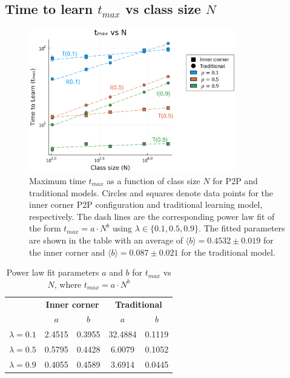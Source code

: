 \newpage

\subsection{Time to learn $t_{max}$ vs class size $N$} \label{subsec: 2DBPCA tmax vs N}
\begin{figure}[h!]
    \centering
    \includegraphics[width=0.8\textwidth]{figures/2D-BPCA-analysis/N_vs_tmax-traditional-inner_corner.png}
    \caption[Class size dependence of time to learn in homogenous models]{Maximum time $t_{max}$ as a function of class size $N$ for P2P and traditional models. Circles and squares denote data points for the inner corner P2P configuration and traditional learning model, respectively. The dash lines are the corresponding power law fit of the form $t_{max}=a \cdot N^b$ using $\lambda \in \lbrace 0.1, 0.5, 0.9 \rbrace$. The fitted parameters are shown in the table with an average of $\langle b \rangle = 0.4532 \pm 0.019$ for the inner corner and $\langle b \rangle = 0.087\pm0.021$ for the traditional model.}
    \label{fig:Traditional vs PI tmax vs N}
\end{figure}

\begin{table}[htbp!]
  \centering
  
  \begin{tabular}{|c|cc|cc|}
    \hline
    & \multicolumn{2}{c|}{\textbf{Inner corner}}       & \multicolumn{2}{c|}{\textbf{Traditional}}        \\ \cline{2-5} 
    & \multicolumn{1}{c|}{\textbf{$a$}} & \textbf{$b$} & \multicolumn{1}{c|}{\textbf{$a$}} & \textbf{$b$} \\ \hline
    \textbf{$\lambda=0.1$} & \multicolumn{1}{c|}{2.4515}       & 0.3955       & \multicolumn{1}{c|}{32.4884}      & 0.1119       \\ \hline
    \textbf{$\lambda=0.5$} & \multicolumn{1}{c|}{0.5795}       & 0.4428       & \multicolumn{1}{c|}{6.0079}       & 0.1052       \\ \hline
    \textbf{$\lambda=0.9$} & \multicolumn{1}{c|}{0.4055}       & 0.4589       & \multicolumn{1}{c|}{3.6914}       & 0.0445       \\ \hline
  \end{tabular}
  \caption{Power law fit parameters $a$ and $b$ for $t_{max}$ vs $N$, where $t_{max}=a \cdot N ^ b$}
  \label{tab:2DBPCA tmax vs N fit params}
\end{table}

